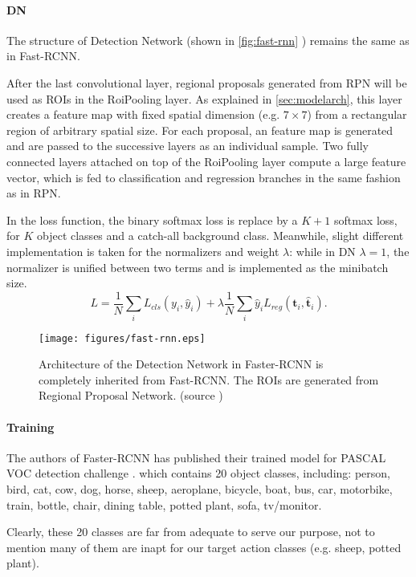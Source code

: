 \paragraph{DN}
The structure of Detection Network (shown in \autoref{fig:fast-rnn} \cite{girshick2015fast}) remains the same as in Fast-RCNN.

After the last convolutional layer, regional proposals generated from RPN will be used as ROIs in the RoiPooling layer. 
As explained in \autoref{sec:modelarch}, this layer creates a feature map with fixed spatial dimension (e.g. $ 7 \times 7 $) from a rectangular region of arbitrary spatial size. For each proposal, an feature map is generated and are passed to the successive layers as an individual sample.
Two fully connected layers attached on top of the RoiPooling layer compute a large feature vector, which is fed to classification and regression branches in the same fashion as in RPN.

In the loss function, the binary softmax loss is replace by a $ K+1 $ softmax loss, for $ K $ object classes and a catch-all background class. Meanwhile, slight different implementation is taken for the normalizers and weight $ \lambda $: while in DN $ \lambda =1 $, the normalizer is unified between two terms and is implemented as the minibatch size.
\begin{equation}
L = \dfrac{1}{N}\sum_{i}L_{cls}\left(y_{i},\hat{y}_{i}\right) + \lambda \dfrac{1}{N}\sum_{i}\hat{y}_{i}L_{reg}\left(\mathbf{t}_{i}, \hat{\mathbf{t}}_{i}\right).
\end{equation}
\begin{figure}
\centering
\texttt{[image: figures/fast-rnn.eps]}
\caption[Detection Network of Faster-RCNN]{Architecture of the Detection Network in Faster-RCNN is completely inherited from Fast-RCNN. The ROIs are generated from Regional Proposal Network. (source \cite{girshick2015fast})}
\label{fig:fast-rnn}
\end{figure}
\paragraph{Training}
The authors of Faster-RCNN has published their trained model for PASCAL VOC detection challenge \cite{pascal-voc-2012}. which contains 20 object classes, including:
person, bird, cat, cow, dog, horse, sheep, aeroplane, bicycle, boat, bus, car, motorbike, train, bottle, chair, dining table, potted plant, sofa, tv/monitor.

Clearly, these 20 classes are far from adequate to serve our purpose, not to mention many of them are inapt for our target action classes (e.g. sheep, potted plant).

